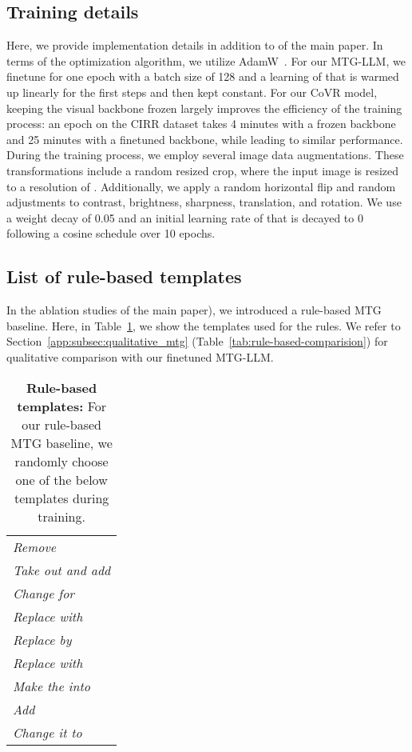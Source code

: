 \subsection{Training details}
\label{app:subsec:training}
Here, we provide implementation details
in addition to
\if{} \fi
of the main paper. 
In terms of the optimization algorithm, 
we utilize AdamW~\cite{loshchilov2017decoupled}.
For our MTG-LLM, we finetune for one epoch with a batch size of 128 and a learning of  that is warmed up linearly for the first  steps and then kept constant.
For our CoVR model, keeping the visual backbone frozen largely improves the efficiency of the training process:
an epoch on the CIRR dataset takes 4 minutes with a frozen backbone and 25 minutes with a finetuned backbone, while leading to similar performance.
During the training process, 
we employ several image data augmentations. 
These transformations include a random resized crop, 
where the input image is resized to a resolution of . 
Additionally, we apply a random horizontal flip and random adjustments to contrast, brightness, sharpness, translation, and rotation.
We use a weight decay of 0.05 and an initial learning rate of  that is decayed to 0 following a cosine schedule over 10 epochs.

\subsection{List of rule-based templates}
\label{app:subsec:rule-based}

In the ablation studies 
\if{} \fi
of the main paper),
we introduced a rule-based MTG baseline.
Here, in Table~\ref{tab:rule-based-templates}, we show the templates used for the rules.
We refer to Section~\ref{app:subsec:qualitative_mtg} (Table~\ref{tab:rule-based-comparision})
for qualitative comparison with our finetuned MTG-LLM.

\begin{table}\centering
\caption{\textbf{Rule-based templates:}
For our rule-based MTG baseline, we randomly
choose one of the below templates during training.
}
    \begin{tabular}{l}
    \toprule
    \textit{Remove  }\\
    \textit{Take out  and add  } \\
    \textit{Change  for  } \\
    \textit{Replace  with  } \\
    \textit{Replace  by  } \\
    \textit{Replace  with  } \\
    \textit{Make the  into  } \\
    \textit{Add  } \\
    \textit{Change it to  } \\
    \bottomrule
\end{tabular}
\label{tab:rule-based-templates}
\end{table} 
